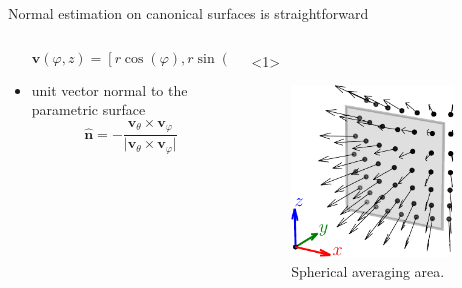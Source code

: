 \documentclass[xcolor=dvipsnames,10pt]{beamer}
\begin{document}
\begin{frame}{Normal estimation on canonical surfaces is straightforward}
\begin{columns}[c]
\begin{column}{0.7\textwidth}
\begin{itemize}
\begin{onlyenv}
                \begin{equation*}
                    \boldsymbol{v}(\varphi, z) = [ r \cos(\varphi), r \sin(\varphi), z ]
                \end{equation*}
                \end{onlyenv}
                \item unit vector normal to the parametric surface
                \begin{equation*}
                \boldsymbol{\hat n} = - \frac{\boldsymbol{v}_\theta \times \boldsymbol{v}_\varphi}{\big| \boldsymbol{v}_\theta \times \boldsymbol{v}_\varphi \big|}
                \end{equation*}
            \end{itemize}
        \end{column}
        \begin{column}{0.3\textwidth}
            \begin{onlyenv}<1>
            \begin{center}
                \begin{figure}
                    \includegraphics[width=0.9\textwidth]{figures/eval_spherical.pdf}
                    \caption{Spherical averaging area.}
                \end{figure}
            \end{center}
            \end{onlyenv}

\end{column}
\end{columns}
\end{frame}
\end{document}
